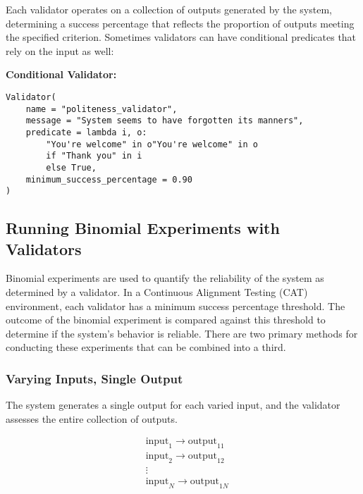 \documentclass{article}
\begin{document}
Each validator operates on a collection of outputs generated by the system, determining a success percentage that reflects the proportion of outputs meeting the specified criterion. Sometimes validators can have conditional predicates that rely on the input as well:

\vspace{1em}
\textbf{Conditional Validator:}
\begin{center}
\begin{minipage}{0.9\linewidth}
\begin{lstlisting}
Validator(
    name = "politeness_validator",
    message = "System seems to have forgotten its manners",
    predicate = lambda i, o:
        "You're welcome" in o"You're welcome" in o
        if "Thank you" in i
        else True,
    minimum_success_percentage = 0.90
)
\end{lstlisting}
\end{minipage}
\end{center}

\subsection{Running Binomial Experiments with Validators}

Binomial experiments are used to quantify the reliability of the system as determined by a validator. In a Continuous Alignment Testing (CAT) environment, each validator has a minimum success percentage threshold. The outcome of the binomial experiment is compared against this threshold to determine if the system's behavior is reliable. There are two primary methods for conducting these experiments that can be combined into a third.

\subsubsection{Varying Inputs, Single Output}
The system generates a single output for each varied input, and the validator assesses the entire collection of outputs.

\begin{equation*}
\begin{aligned}
&\text{input}_1 \rightarrow \text{output}_{11} \\
&\text{input}_2 \rightarrow \text{output}_{12} \\
&\vdots \\
&\text{input}_N \rightarrow \text{output}_{1N}
\end{aligned}
\end{equation*}
\end{document}
